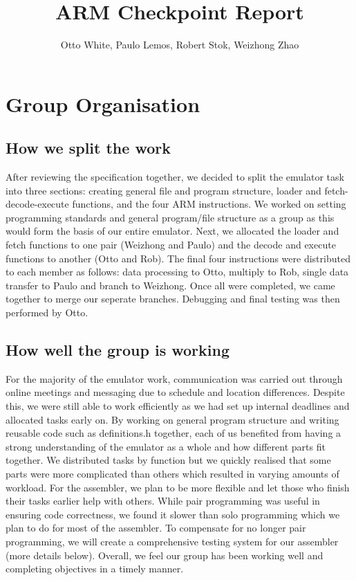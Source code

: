 \documentclass[11pt]{article}
\begin{document}
  \title{ARM Checkpoint Report}
  \author{Otto White, Paulo Lemos, Robert Stok, Weizhong Zhao}

  \maketitle

  \section*{Group Organisation}

  \subsection*{How we split the work}

After reviewing the specification together, we decided to split the emulator task into three  sections: creating general file and program structure, loader and fetch-decode-execute functions, and the four ARM instructions. We worked on setting programming standards and general program/file structure as a group as this would form the basis of our entire emulator. Next, we allocated the loader and fetch functions to one pair (Weizhong and Paulo) and the decode and execute functions to another (Otto and Rob). The final four instructions were distributed to each member as follows: data processing to Otto, multiply to Rob, single data transfer to Paulo and branch to Weizhong. Once all were completed, we came together to merge our seperate branches. Debugging and final testing was then performed by Otto.

  \subsection*{How well the group is working}

For the majority of the emulator work, communication was carried out through online meetings and messaging due to schedule and location differences. Despite this, we were still able to work efficiently as we had set up internal deadlines and allocated tasks early on. By working on general program structure and writing reusable code such as definitions.h together, each of us benefited from having a strong understanding of the emulator as a whole and how different parts fit together. We distributed tasks by function but we quickly realised that some parts were more complicated than others which resulted in varying amounts of workload. For the assembler, we plan to be more flexible and let those who finish their tasks earlier help with others. While pair programming was useful in ensuring code correctness, we found it slower than solo programming which we plan to do for most of the assembler. To compensate for no longer pair programming, we will create a comprehensive testing system for our assembler (more details below). Overall, we feel our group has been working well and completing objectives in a timely manner.
\end{document}
